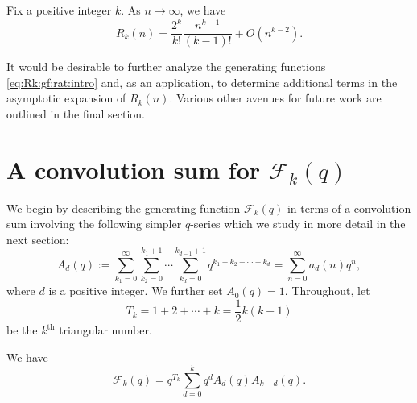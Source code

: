 \documentclass[11pt]{article}
\theoremstyle{plain}
\theoremstyle{definition}
\newcommand{\assign}{:=}
\newcommand{\rightarrowlim}{\mathop{\rightarrow}\limits}
\begin{document}
\begin{theorem}
  \label{thm:Rk:asy:intro}Fix a positive integer $k$. As $n \rightarrowlim
  \infty$, we have
  \begin{equation}
    R_k (n) = \frac{2^k}{k!} \frac{n^{k - 1}}{(k - 1) !} + O (n^{k - 2}) .
    \label{eq:Rk:asy:intro}
  \end{equation}
\end{theorem}

It would be desirable to further analyze the generating functions
\eqref{eq:Rk:gf:rat:intro} and, as an application, to determine additional
terms in the asymptotic expansion of $R_k (n)$. Various other avenues for
future work are outlined in the final section.

\section{A convolution sum for \texorpdfstring{$\mathcal{F}_k (q)$}{Fk(q)}}\label{sec:Fk:convolution}

We begin by describing the generating function $\mathcal{F}_k (q)$ in terms of
a convolution sum involving the following simpler $q$-series which we study in
more detail in the next section:
\begin{equation}
  A_d (q) \assign \sum_{k_1 = 0}^{\infty} \sum_{k_2 = 0}^{k_1 + 1} \cdots
  \sum_{k_d = 0}^{k_{d - 1} + 1} q^{k_1 + k_2 + \cdots + k_d} = \sum_{n =
  0}^{\infty} a_d (n) q^n, \label{eq:Aq:def}
\end{equation}
where $d$ is a positive integer. We further set $A_0 (q) = 1$. Throughout, let
\begin{equation*}
  T_k = 1 + 2 + \cdots + k = \frac{1}{2} k (k + 1)
\end{equation*}
be the $k^{\text{th}}$ triangular number.

\begin{lemma}
  \label{lem:F:gf}We have
  \begin{equation}
    \mathcal{F}_k (q) = q^{T_k} \sum_{d = 0}^k q^d A_d (q) A_{k - d} (q) .
    \label{eq:F:gf}
  \end{equation}
\end{lemma}
\end{document}
